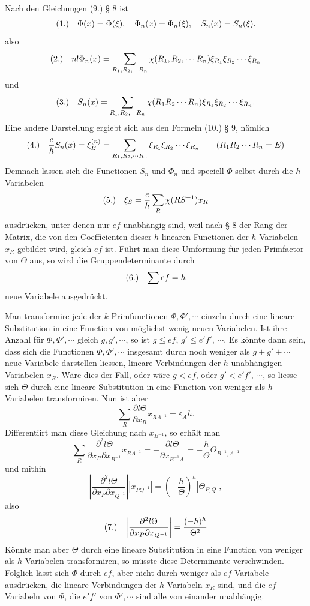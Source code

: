 \documentclass[11pt]{article}
\makeatletter
\newcommand{\frobtag}[2]{\[\begin{array}{@{}r@{\quad}l@{}}\textup{(#1)} & \displaystyle #2\end{array}\]}
\newcommand{\frobtagc}[2]{\[\begin{array}{@{}r@{\quad}c@{}}\textup{(#1)} & \displaystyle #2\end{array}\]}
\makeatother
\begin{document}
Nach den Gleichungen (9.) § 8 ist
\frobtagc{1.}{\Phi(x)=\Phi(\xi),\quad \Phi_n(x)=\Phi_n(\xi),\quad S_n(x)=S_n(\xi).}
also
\frobtag{2.}{n!\Phi_n(x)=\sum_{R_1,R_2,\cdots R_n}\chi(R_1,R_2,\cdots R_n)\xi_{R_1}\xi_{R_2}\cdots\xi_{R_n}}
und
\frobtag{3.}{S_n(x)=\sum_{R_1,R_2,\cdots R_n}\chi(R_1R_2\cdots R_n)\xi_{R_1}\xi_{R_2}\cdots\xi_{R_n}.}
Eine andere Darstellung ergiebt sich aus den Formeln (10.) § 9, nämlich
\frobtag{4.}{\frac{e}{h}S_n(x)=\xi_E^{(n)}=\sum_{R_1,R_2,\cdots R_n}\xi_{R_1}\xi_{R_2}\cdots\xi_{R_n}\qquad (R_1R_2\cdots R_n=E)}
Demnach lassen sich die Functionen $S_n$ und $\Phi_n$ und speciell $\Phi$ selbst durch die $h$ Variabelen
\frobtagc{5.}{\xi_S=\frac{e}{h}\sum_R\chi(RS^{-1})x_R}
ausdrücken, unter denen nur $ef$ unabhängig sind, weil nach § 8 der Rang der Matrix, die von den Coefficienten dieser $h$ linearen Functionen der $h$ Variabelen $x_R$ gebildet wird, gleich $ef$ ist. Führt man diese Umformung für jeden Primfactor von $\Theta$ aus, so wird die Gruppendeterminante durch
\frobtagc{6.}{\sum ef=h}
neue Variabele ausgedrückt.

Man transformire jede der $k$ Primfunctionen $\Phi,\Phi',\cdots$ einzeln durch eine lineare Substitution in eine Function von möglichst wenig neuen Variabelen. Ist ihre Anzahl für $\Phi,\Phi',\cdots$ gleich $g,g',\cdots$, so ist $g\le ef$, $g'\le e'f'$, $\cdots$. Es könnte dann sein, dass sich die Functionen $\Phi,\Phi',\cdots$ insgesamt durch noch weniger als $g+g'+\cdots$ neue Variabele darstellen liessen, lineare Verbindungen der $h$ unabhängigen Variabelen $x_R$. Wäre dies der Fall, oder wäre $g<ef$, oder $g'<e'f'$, $\cdots$, so liesse sich $\Theta$ durch eine lineare Substitution in eine Function von weniger als $h$ Variabelen transformiren. Nun ist aber
\[
\sum_R\frac{\partial l\Theta}{\partial x_R}x_{RA^{-1}}=\varepsilon_A h.
\]
Differentiirt man diese Gleichung nach $x_{B^{-1}}$, so erhält man
\[
\sum_R\frac{\partial^2 l\Theta}{\partial x_R\partial x_{B^{-1}}}x_{RA^{-1}}=-\frac{\partial l\Theta}{\partial x_{B^{-1}A}}=-\frac{h}{\Theta}\Theta_{B^{-1},A^{-1}}
\]
und mithin
\[
\left|\frac{\partial^2 l\Theta}{\partial x_P\partial x_{Q^{-1}}}\right|\left|x_{PQ^{-1}}\right|=\left(-\frac{h}{\Theta}\right)^h\left|\Theta_{P,Q}\right|,
\]
also
\frobtagc{7.}{\left|\frac{\partial^2 l\Theta}{\partial x_P\partial x_{Q^{-1}}}\right|=\frac{(-h)^h}{\Theta^2}}
Könnte man aber $\Theta$ durch eine lineare Substitution in eine Function von weniger als $h$ Variabelen transformiren, so müsste diese Determinante verschwinden. Folglich lässt sich $\Phi$ durch $ef$, aber nicht durch weniger als $ef$ Variabele ausdrücken, die lineare Verbindungen der $h$ Variabeln $x_R$ sind, und die $ef$ Variabeln von $\Phi$, die $e'f'$ von $\Phi',\cdots$ sind alle von einander unabhängig.
\end{document}
